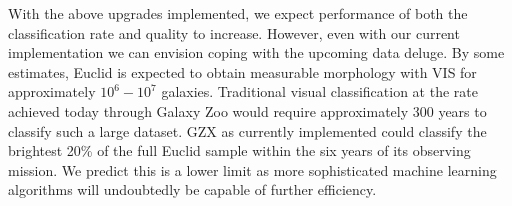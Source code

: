 \documentclass[twocolumn]{aastex6}
\begin{document}

With the above upgrades implemented, we expect performance of both the
classification rate and quality to increase. However, even with our current 
implementation we can envision coping with the upcoming data deluge. 
By some estimates, Euclid is expected to obtain
measurable morphology with VIS for approximately $10^6 - 10^7$ galaxies.
Traditional visual classification at the rate achieved today through Galaxy Zoo 
would require approximately 300 years to classify such a large dataset. 
GZX as currently implemented could  classify the brightest 20\% of the full 
Euclid sample within the six years of its observing mission. 
We predict this is a lower limit as more sophisticated machine learning algorithms
will undoubtedly be capable of further efficiency. 
\end{document}
